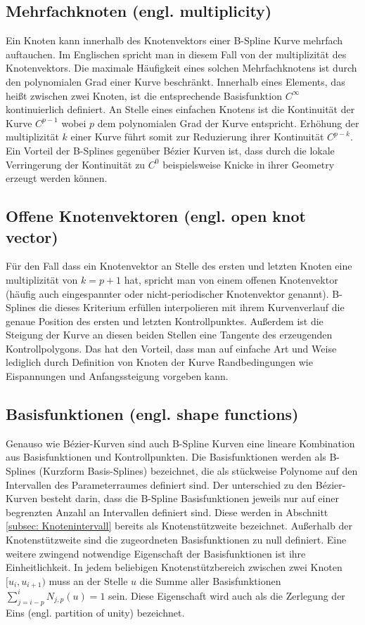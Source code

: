 \documentclass[german,a4paper,12pt,oneside]{scrbook}
\theoremstyle{definition}
\theoremstyle{definition}
\theoremstyle{definition}
\theoremstyle{definition}
\theoremstyle{definition}
\theoremstyle{definition}
\begin{document}
\subsection{Mehrfachknoten (engl. multiplicity)}
Ein Knoten kann innerhalb des Knotenvektors einer B-Spline Kurve mehrfach auftauchen. Im Englischen spricht man in diesem Fall von der multiplizität des Knotenvektors. Die maximale Häufigkeit eines solchen Mehrfachknotens ist durch den polynomialen Grad einer Kurve beschränkt. Innerhalb eines Elements, das heißt zwischen zwei Knoten, ist die entsprechende Basisfunktion $C^{\infty}$ kontinuierlich definiert. An Stelle eines einfachen Knotens ist die Kontinuität der Kurve $C^{p-1}$ wobei $p$ dem polynomialen Grad der Kurve entspricht. Erhöhung der multiplizität $k$ einer Kurve führt somit zur Reduzierung ihrer Kontinuität $C^{p-k}$. Ein Vorteil der B-Splines gegenüber Bézier Kurven ist, dass durch die lokale Verringerung der Kontinuität zu $C^{0}$ beispielsweise Knicke in ihrer Geometry erzeugt werden können.

\subsection{Offene Knotenvektoren (engl. open knot vector)}
Für den Fall dass ein Knotenvektor an Stelle des ersten und letzten Knoten eine multiplizität von $k = p+1$ hat, spricht man von einem offenen Knotenvektor (häufig auch eingespannter oder nicht-periodischer Knotenvektor genannt). B-Splines die dieses Kriterium erfüllen interpolieren mit ihrem Kurvenverlauf die genaue Position des ersten und letzten Kontrollpunktes. Außerdem ist die Steigung der Kurve an diesen beiden Stellen eine Tangente des erzeugenden Kontrollpolygons. Das hat den Vorteil, dass man auf einfache Art und Weise lediglich durch Definition von Knoten der Kurve Randbedingungen wie Eispannungen und Anfangssteigung vorgeben kann.

\subsection{Basisfunktionen (engl. shape functions)}
Genauso wie Bézier-Kurven sind auch B-Spline Kurven eine lineare Kombination aus Basisfunktionen und Kontrollpunkten. Die Basisfunktionen werden als B-Splines (Kurzform Basis-Splines) bezeichnet, die als stückweise Polynome auf den Intervallen des Parameterraumes definiert sind. Der unterschied zu den Bézier-Kurven besteht darin, dass die B-Spline Basisfunktionen jeweils nur auf einer begrenzten Anzahl an Intervallen definiert sind. Diese werden in Abschnitt \ref{subsec: Knotenintervall} bereits als Knotenstützweite bezeichnet. Außerhalb der Knotenstützweite sind die zugeordneten Basisfunktionen zu null definiert. 
Eine weitere zwingend notwendige Eigenschaft der Basisfunktionen ist ihre Einheitlichkeit. In jedem beliebigen Knotenstützbereich zwischen zwei Knoten $[u_i, u_{i+1})$ muss an der Stelle $u$ die Summe aller Basisfunktionen $\sum^{i}_{j=i-p} {N_{j,p}(u)} = 1$ sein. Diese Eigenschaft wird auch als die Zerlegung der Eins (engl. partition of unity) bezeichnet. 
\end{document}

